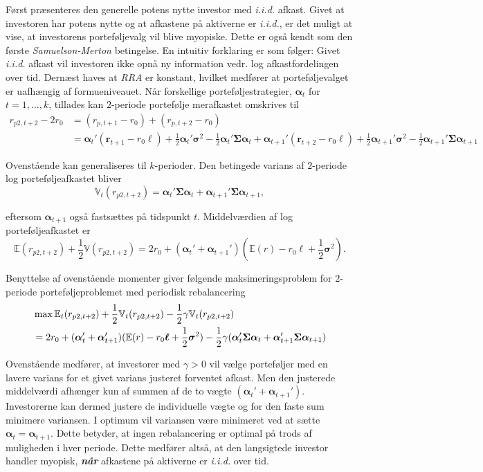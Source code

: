 \documentclass[
  a4paper,
  oneside]{memoir}
\begin{document}
Først præsenteres den generelle potens nytte investor med \emph{i.i.d.} afkast. Givet at investoren har potens nytte og at afkastene på aktiverne er \emph{i.i.d.}, er det muligt at vise, at investorens porteføljevalg vil blive myopiske. Dette er også kendt som den første \emph{Samuelson-Merton} betingelse. En intuitiv forklaring er som følger: Givet \emph{i.i.d.} afkast vil investoren ikke opnå ny information vedr. log afkastfordelingen over tid. Dernæst haves at \emph{RRA} er konstant, hvilket medfører at porteføljevalget er uafhængig af formueniveauet. Når forskellige porteføljestrategier, \(\bm{\alpha}_t\) for \(t=1,\dots,k\), tillades kan \(2\)-periode portefølje merafkastet omskrives til
\begin{align}
r_{p2,t+2}-2r_0&=(r_{p,t+1}-r_0)+(r_{p,t+2}-r_0)\\
&= \bm{\alpha}_t'(\bm{r}_{t+1}-r_0\bm{\ell})+\frac{1}{2}\bm{\alpha}_t'\bm{\sigma}^2-\frac{1}{2} \bm{\alpha}_t'\bm{\Sigma}\bm{\alpha}_t + \bm{\alpha}_{t+1}'(\bm{r}_{t+2}-r_0\bm{\ell})+\frac{1}{2}\bm{\alpha}_{t+1}'\bm{\sigma}^2-\frac{1}{2} \bm{\alpha}_{t+1}'\bm{\Sigma}\bm{\alpha}_{t+1}
\end{align}

Ovenstående kan generaliseres til \(k\)-perioder. Den betingede varians af \(2\)-periode log porteføljeafkastet bliver
\[\mathbb{V}_t(r_{p2,t+2})=\bm{\alpha}_t'\bm{\Sigma}\bm{\alpha}_t+\bm{\alpha}_{t+1}'\bm{\Sigma}\bm{\alpha}_{t+1},\]

eftersom \(\bm{\alpha}_{t+1}\) også fastsættes på tidspunkt \(t\). Middelværdien af log porteføljeafkastet er
\[\mathbb{E}(r_{p2,t+2})+\frac{1}{2}\mathbb{V}(r_{p2,t+2})=2r_0 + (\bm{\alpha}_t'+\bm{\alpha}_{t+1}')(\mathbb{E}(r)-r_0\bm{\ell}+\frac{1}{2}\bm{\sigma}^2).\]

Benyttelse af ovenstående momenter giver følgende maksimeringsproblem for \(2\)-periode porteføljeproblemet med periodisk rebalancering
\begin{align}
&\max\mathbb{E}_t(r_{p2,t+2}) + \frac{1}{2} \mathbb{V}_t(r_{p2,t+2})-\frac{1}{2}\gamma \mathbb{V}_t(r_{p2,t+2})\notag \\
&=2r_0+(\bm{\alpha}_t'+\bm{\alpha}_{t+1}')(\mathbb{E}(r)-r_0\bm{\ell}+\frac{1}{2}\bm{\sigma}^2)-\frac{1}{2}\gamma (\bm{\alpha}_t'\bm{\Sigma}\bm{\alpha}_t+\bm{\alpha}_{t+1}'\bm{\Sigma}\bm{\alpha}_{t+1})
\label{eq:CRRAmakslogk2periode}
\end{align}

Ovenstående medfører, at investorer med \(\gamma>0\) vil vælge porteføljer med en lavere varians for et givet varians justeret forventet afkast. Men den justerede middelværdi afhænger kun af summen af de to vægte \((\bm{\alpha}_t'+\bm{\alpha}_{t+1}')\). Investorerne kan dermed justere de individuelle vægte og for den faste sum minimere variansen. I optimum vil variansen være minimeret ved at sætte \(\bm{\alpha}_t=\bm{\alpha}_{t+1}\). Dette betyder, at ingen rebalancering er optimal på trods af muligheden i hver periode. Dette medfører altså, at den langsigtede investor handler myopisk, \textbf{\emph{når}} afkastene på aktiverne er \emph{i.i.d.} over tid.
\end{document}
